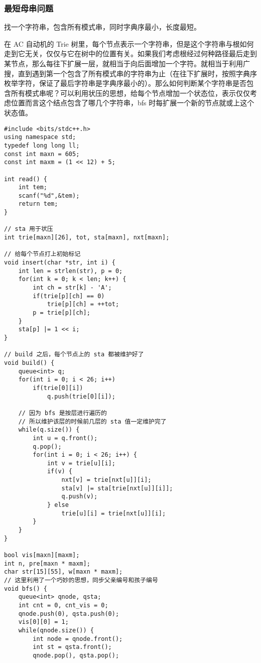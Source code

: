 \documentclass[UTF8]{article}
\begin{document}
\subsubsection{最短母串问题}
找一个字符串，包含所有模式串，同时字典序最小，长度最短。

在 AC 自动机的 Trie 树里，每个节点表示一个字符串，但是这个字符串与根如何走到它无关，仅仅与它在树中的位置有关。如果我们考虑根经过何种路径最后走到某节点，那么每往下扩展一层，就相当于向后面增加一个字符。就相当于利用广搜，直到遇到第一个包含了所有模式串的字符串为止（在往下扩展时，按照字典序枚举字符，保证了最后字符串是字典序最小的）。那么如何判断某个字符串是否包含所有模式串呢？可以利用状压的思想，给每个节点增加一个状态位，表示仅仅考虑位置而言这个结点包含了哪几个字符串，bfs 时每扩展一个新的节点就或上这个状态值。

\begin{lstlisting}[caption=最短母串问题]
#include <bits/stdc++.h>
using namespace std;
typedef long long ll;
const int maxn = 605;
const int maxm = (1 << 12) + 5;

int read() {
    int tem;
    scanf("%d",&tem);
    return tem;
}

// sta 用于状压
int trie[maxn][26], tot, sta[maxn], nxt[maxn];

// 给每个节点打上初始标记
void insert(char *str, int i) {
    int len = strlen(str), p = 0;
    for(int k = 0; k < len; k++) {
        int ch = str[k] - 'A';
        if(trie[p][ch] == 0)
            trie[p][ch] = ++tot;
        p = trie[p][ch];
    }
    sta[p] |= 1 << i;
}

// build 之后，每个节点上的 sta 都被维护好了
void build() {
    queue<int> q;
    for(int i = 0; i < 26; i++)
        if(trie[0][i])
            q.push(trie[0][i]);
    
    // 因为 bfs 是按层进行遍历的
    // 所以维护该层的时候前几层的 sta 值一定维护完了
    while(q.size()) {
        int u = q.front();
        q.pop();
        for(int i = 0; i < 26; i++) {
            int v = trie[u][i];
            if(v) {
                nxt[v] = trie[nxt[u]][i];
                sta[v] |= sta[trie[nxt[u]][i]];
                q.push(v);
            } else
                trie[u][i] = trie[nxt[u]][i];
        }
    }
}

bool vis[maxn][maxm];
int n, pre[maxn * maxm];
char str[15][55], w[maxn * maxm];
// 这里利用了一个巧妙的思想，同步父亲编号和孩子编号
void bfs() {
    queue<int> qnode, qsta;
    int cnt = 0, cnt_vis = 0;
    qnode.push(0), qsta.push(0);
    vis[0][0] = 1;
    while(qnode.size()) {
        int node = qnode.front();
		int st = qsta.front();
		qnode.pop(), qsta.pop();


\end{lstlisting}
\end{document}
